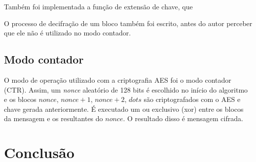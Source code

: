\documentclass[a4paper, 10.5pt]{article}
\begin{document}
Também foi implementada a função de extensão de chave, que 

O processo de decifração de um bloco também foi escrito, antes do autor perceber que ele não é utilizado no modo contador.

\subsection{Modo contador} %
\label{sec:ctr}
    O modo de operação utilizado com a criptografia AES foi o modo contador (CTR).
    Assim, um \textit{nonce} aleatório de 128 bits é escolhido no início do
    algoritmo e os blocos $nonce$, $nonce+1$, $nonce+2$, $dots$ são
    criptografados com o AES e chave gerada anteriormente. É executado um ou
    exclusivo (xor) entre os blocos da mensagem e os resultantes do $nonce$. O
    resultado disso é mensagem cifrada.

    

\section{Conclusão} %
\label{sec:conclusao}
    

% 


\end{document}
